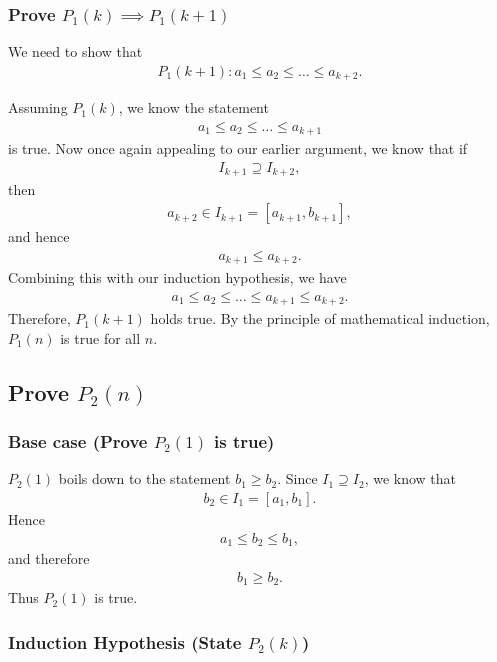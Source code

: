 \documentclass{article}
\begin{document}
\subsubsection{Prove $P_1(k) \implies P_1(k+1)$}

We need to show that
\begin{align*}
	P_1(k+1): a_1 \le a_2 \le \ldots \le a_{k+2}.
\end{align*}

Assuming $P_1(k)$, we know the statement 
\begin{align*}
	a_1 \le a_2 \le \ldots \le a_{k+1}
\end{align*}
is true. Now once again appealing to our earlier argument, we know that if 
\begin{align*}
	I_{k+1} \supseteq I_{k+2},
\end{align*}
then 
\begin{align*}
	a_{k+2} \in I_{k+1} = [a_{k+1}, b_{k+1}],
\end{align*}
and hence 
\begin{align*}
	a_{k+1} \le a_{k+2}.
\end{align*}
Combining this with our induction hypothesis, we have
\begin{align*}
	a_1 \le a_2 \le \ldots \le a_{k+1} \le a_{k+2}.
\end{align*}
Therefore, $P_1(k+1)$ holds true. By the principle of mathematical induction, $P_1(n)$ is true for all $n$.

\subsection{Prove $P_2(n)$}

\subsubsection{Base case (Prove $P_2(1)$ is true)}

$P_2(1)$ boils down to the statement $b_1 \ge b_2$. Since $I_1 \supseteq I_2$, we know that 
\begin{align*}
	b_2 \in I_1 = [a_1, b_1].
\end{align*}
Hence 
\begin{align*}
	a_1 \le b_2 \le b_1,
\end{align*}
and therefore 
\begin{align*}
	b_1 \ge b_2.
\end{align*}
Thus $P_2(1)$ is true.

\subsubsection{Induction Hypothesis (State $P_2(k)$)}
\end{document}
